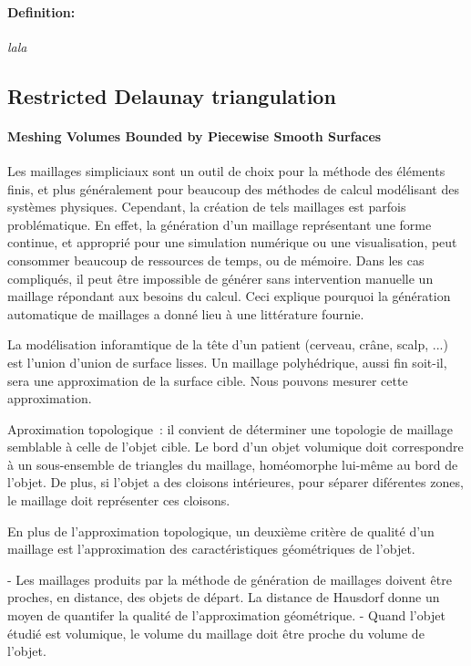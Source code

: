 \paragraph{Definition:}
          {\it 
            lala
          }

\subsection{Restricted Delaunay triangulation}



\paragraph{Meshing Volumes Bounded by Piecewise Smooth Surfaces~\cite{LRineau2007}}{




Les maillages simpliciaux sont un outil de choix pour la méthode des éléments finis, et plus généralement pour beaucoup des méthodes de calcul modélisant des systèmes physiques. Cependant, la création de tels maillages est parfois problématique. En effet, la génération d'un maillage représentant une forme continue, et approprié pour une simulation numérique ou une visualisation, peut consommer beaucoup de ressources de temps, ou de mémoire. Dans les cas compliqués, il peut être impossible de générer sans intervention manuelle un maillage répondant aux besoins du calcul. Ceci explique pourquoi la génération automatique de maillages a donné lieu à une littérature fournie. 

La modélisation inforamtique de la tête d'un patient (cerveau, cr\^ane, scalp, ...) est l'union d'union de surface lisses. Un maillage polyhédrique, aussi fin soit-il, sera une approximation de la surface cible. Nous pouvons mesurer cette approximation. 

Aproximation topologique~: il convient de déterminer une topologie de maillage semblable à celle de l'objet cible. Le bord d'un objet volumique doit correspondre à un sous-ensemble de triangles du maillage, homéomorphe lui-même au bord de l'objet. De plus, si l'objet a des cloisons intérieures, pour séparer diférentes zones, le maillage doit représenter ces cloisons.

En plus de l'approximation topologique, un deuxième critère de qualité d'un maillage est l'approximation des caractéristiques géométriques de l'objet.

 - Les maillages produits par la méthode de génération de maillages doivent être proches, en distance, des objets de départ. La distance de Hausdorf donne un moyen de quantifer la qualité de l'approximation géométrique.
 - Quand l'objet étudié est volumique, le volume du maillage doit être proche du volume de l'objet.



}
